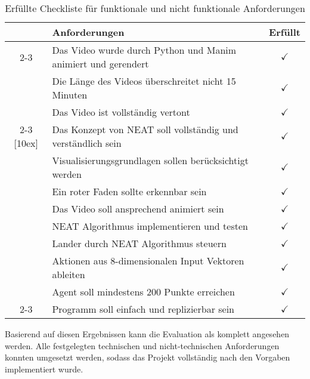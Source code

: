 \begin{table}[h]
	\centering
	\begin{tabularx}{\textwidth}{|c|X|c|}
		\hline
		\multirow{34}{*}[4ex]{\rotatebox[origin=c]{90}{\centering \textbf{Visualisierung}}} & \textbf{Anforderungen} & \textbf{Erfüllt} \\
		\cline{2-3}
		& Das Video wurde durch Python und Manim animiert und gerendert & $\checkmark$ \\[4ex]
		& Die Länge des Videos überschreitet nicht 15 Minuten & $\checkmark$ \\[4ex]
		& Das Video ist vollständig vertont & $\checkmark$ \\[4ex]
		\cline{2-3}
		\multirow{44}{*}[10ex]{\rotatebox[origin=c]{90}{\centering \textbf{Implementierung}}} & Das Konzept von NEAT soll vollständig und verständlich sein & $\checkmark$ \\[4ex]
		& Visualisierungsgrundlagen sollen berücksichtigt werden & $\checkmark$ \\[4ex]
		& Ein roter Faden sollte erkennbar sein & $\checkmark$ \\[4ex]
		& Das Video soll ansprechend animiert sein & $\checkmark$ \\[4ex]
		\hline
		& NEAT Algorithmus implementieren und testen & $\checkmark$ \\[4ex]
		& Lander durch NEAT Algorithmus steuern & $\checkmark$ \\[4ex]
		& Aktionen aus 8-dimensionalen Input Vektoren ableiten & $\checkmark$ \\[4ex]
		& Agent soll mindestens 200 Punkte erreichen & $\checkmark$ \\[4ex]
		\cline{2-3}
		& Programm soll einfach und replizierbar sein & $\checkmark$ \\[4ex]
		\hline
	\end{tabularx}
	\caption{Erfüllte Checkliste für funktionale und nicht funktionale Anforderungen}
\end{table}

Basierend auf diesen Ergebnissen kann die Evaluation als komplett angesehen werden. Alle festgelegten technischen und nicht-technischen Anforderungen konnten umgesetzt werden, sodass das Projekt vollständig nach den Vorgaben implementiert wurde.


